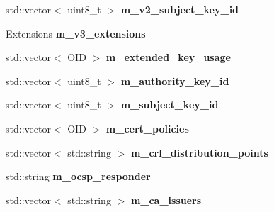 \begin{DoxyCompactItemize}
std\+::vector$<$ uint8\+\_\+t $>$ {\bfseries m\+\_\+v2\+\_\+subject\+\_\+key\+\_\+id}
\item 
\mbox{\label{struct_botan_1_1_x509___certificate___data_a2ebc24c06267be95999d0df325ae74f3}} 
Extensions {\bfseries m\+\_\+v3\+\_\+extensions}
\item 
\mbox{\label{struct_botan_1_1_x509___certificate___data_ac5cf49fedd6a3d5b35668d478d06fbc6}} 
std\+::vector$<$ O\+ID $>$ {\bfseries m\+\_\+extended\+\_\+key\+\_\+usage}
\item 
\mbox{\label{struct_botan_1_1_x509___certificate___data_a949568b1f58e4b0e84f973b095b9db7f}} 
std\+::vector$<$ uint8\+\_\+t $>$ {\bfseries m\+\_\+authority\+\_\+key\+\_\+id}
\item 
\mbox{\label{struct_botan_1_1_x509___certificate___data_a05dd700849d5d42f8ce954e4505812a1}} 
std\+::vector$<$ uint8\+\_\+t $>$ {\bfseries m\+\_\+subject\+\_\+key\+\_\+id}
\item 
\mbox{\label{struct_botan_1_1_x509___certificate___data_a7bae2f4101b760dbce5efa6784fadaf9}} 
std\+::vector$<$ O\+ID $>$ {\bfseries m\+\_\+cert\+\_\+policies}
\item 
\mbox{\label{struct_botan_1_1_x509___certificate___data_a298b2c65015bfedf1f05f57d85fb2e93}} 
std\+::vector$<$ std\+::string $>$ {\bfseries m\+\_\+crl\+\_\+distribution\+\_\+points}
\item 
\mbox{\label{struct_botan_1_1_x509___certificate___data_a57f08c42237fd941dfddde2e18b6cfda}} 
std\+::string {\bfseries m\+\_\+ocsp\+\_\+responder}
\item 
\mbox{\label{struct_botan_1_1_x509___certificate___data_a062fb3e845883b625ae4309d801c51e0}} 
std\+::vector$<$ std\+::string $>$ {\bfseries m\+\_\+ca\+\_\+issuers}
\item 
\mbox{\label{struct_botan_1_1_x509___certificate___data_a508b3eb5771588c2bf85afd63101f0d7}} 

\end{DoxyCompactItemize}
